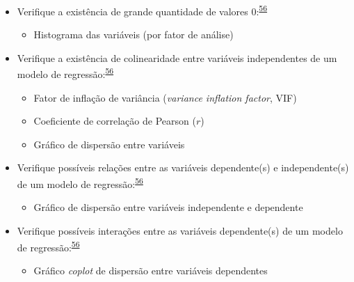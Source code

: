 \documentclass[
]{book}
\providecommand{\tightlist}{%
  \setlength{\itemsep}{0pt}\setlength{\parskip}{0pt}}
\begin{document}
\begin{itemize}
\item
  Verifique a existência de grande quantidade de valores 0:\textsuperscript{\protect\hyperlink{ref-zuur2009}{56}}

  \begin{itemize}
  \tightlist
  \item
    Histograma das variáveis (por fator de análise)
  \end{itemize}
\end{itemize}

\begin{itemize}
\item
  Verifique a existência de colinearidade entre variáveis independentes de um modelo de regressão:\textsuperscript{\protect\hyperlink{ref-zuur2009}{56}}

  \begin{itemize}
  \item
    Fator de inflação de variância (\emph{variance inflation factor}, VIF)
  \item
    Coeficiente de correlação de Pearson (\(r\))
  \item
    Gráfico de dispersão entre variáveis
  \end{itemize}
\end{itemize}

\begin{itemize}
\item
  Verifique possíveis relações entre as variáveis dependente(s) e independente(s) de um modelo de regressão:\textsuperscript{\protect\hyperlink{ref-zuur2009}{56}}

  \begin{itemize}
  \tightlist
  \item
    Gráfico de dispersão entre variáveis independente e dependente
  \end{itemize}
\end{itemize}

\begin{itemize}
\item
  Verifique possíveis interações entre as variáveis dependente(s) de um modelo de regressão:\textsuperscript{\protect\hyperlink{ref-zuur2009}{56}}

  \begin{itemize}
  \tightlist
  \item
    Gráfico \emph{coplot} de dispersão entre variáveis dependentes
  \end{itemize}
\end{itemize}
\end{document}
